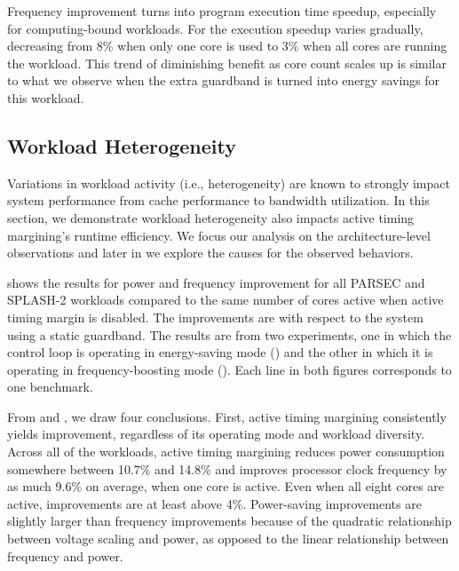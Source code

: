 Frequency improvement turns into program execution time speedup, especially for computing-bound workloads. For  the execution speedup varies gradually, decreasing from 8\% when only one core is used to 3\% when all cores are running the workload. This trend of diminishing benefit as core count scales up is similar to what we observe when the extra guardband is turned into energy savings for this workload. 

\subsection{Workload Heterogeneity}
\label{sec:voltage:characterization:workload-variation}

Variations in workload activity (i.e., heterogeneity) are known to strongly impact system performance from cache performance to bandwidth utilization. In this section, we demonstrate workload heterogeneity also impacts active timing margining's runtime efficiency. We focus our analysis on the architecture-level observations and later in  we explore the causes for the observed behaviors.

 shows the results for power and frequency improvement for all PARSEC and SPLASH-2 workloads compared to the same number of cores active when active timing margin is disabled. The improvements are with respect to the system using a static guardband. The results are from two experiments, one in which the control loop is operating in energy-saving mode () and the other in which it is operating in frequency-boosting mode (). Each line in both figures corresponds to one benchmark.

From  and , we draw four conclusions. First, active timing margining consistently yields improvement, regardless of its operating mode and workload diversity. Across all of the workloads, active timing margining reduces power consumption somewhere between 10.7\% and 14.8\% and improves processor clock frequency by as much 9.6\% on average, when one core is active. Even when all eight cores are active, improvements are at least above 4\%. Power-saving improvements are slightly larger than frequency improvements because of the quadratic relationship between voltage scaling and power, as opposed to the linear relationship between frequency and power.


